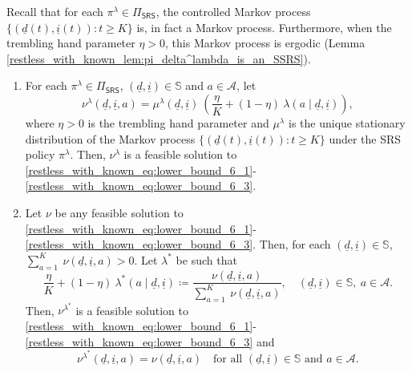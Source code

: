 Recall that for each $\pi^\lambda\in \Pi_{\textsf{SRS}}$, the controlled Markov process $\{(\underline{d}(t), \underline{i}(t)):t\geq K\}$ is, in fact a Markov process. Furthermore, when the trembling hand parameter $\eta>0$, this Markov process is ergodic (Lemma \ref{restless_with_known_lem:pi_delta^lambda_is_an_SSRS}).
\begin{theorem} 
\label{restless_with_known_theorem:restriction_to_SRS_policies}
	\begin{enumerate}
		\item For each $\pi^\lambda\in \Pi_{\textsf{SRS}}$, $(\underline{d}, \underline{i})\in \mathbb{S}$ and $a\in \mathcal{A}$, let
			\begin{equation}
				\nu^\lambda(\underline{d}, \underline{i}, a) = \mu^\lambda(\underline{d}, \underline{i})~\left(\frac{\eta}{K} + (1-\eta) ~\lambda(a\mid \underline{d}, \underline{i})\right),
			\end{equation}
			where $\eta>0$ is the trembling hand parameter and $\mu^\lambda$ is the unique stationary distribution of the Markov process $\{(\underline{d}(t), \underline{i}(t)):t\geq K\}$ under the SRS policy $\pi^\lambda$. Then, $\nu^\lambda$ is a feasible  solution to \eqref{restless_with_known_eq:lower_bound_6_1}-\eqref{restless_with_known_eq:lower_bound_6_3}.
			
		\item Let $\nu$ be any feasible solution to \eqref{restless_with_known_eq:lower_bound_6_1}-\eqref{restless_with_known_eq:lower_bound_6_3}. Then, for each $(\underline{d}, \underline{i})\in \mathbb{S}$, $\sum\limits_{a=1}^{K} ~\nu(\underline{d}, \underline{i}, a) > 0$.
				Let $\lambda^*$ be such that
				$$
				\frac{\eta}{K}+(1-\eta)~\lambda^*(a\mid \underline{d}, \underline{i}) \coloneqq \frac{\nu(\underline{d}, \underline{i}, a)}{\sum\limits_{a=1}^{K} ~\nu(\underline{d}, \underline{i}, a)}, \quad (\underline{d}, \underline{i})\in \mathbb{S}, ~a\in \mathcal{A}.
				$$
				Then, $\nu^{\lambda^*}$ is a feasible solution to \eqref{restless_with_known_eq:lower_bound_6_1}-\eqref{restless_with_known_eq:lower_bound_6_3} and 
				$$
				\nu^{\lambda^*}(\underline{d}, \underline{i}, a)=\nu(\underline{d}, \underline{i}, a)\quad \text{for all }(\underline{d}, \underline{i})\in \mathbb{S}\text{ and }a\in \mathcal{A}.
				$$
	\end{enumerate}
\end{theorem}

